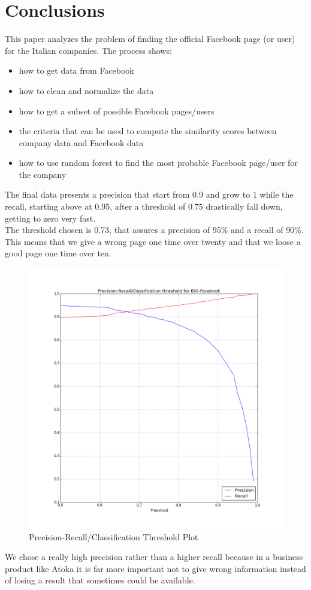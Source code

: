 \chapter{Conclusions} 
This paper analyzes the problem of finding the official Facebook page (or user) for the Italian companies.
The process shows:
\begin{itemize}
\item how to get data from Facebook
\item how to clean and normalize the data
\item how to get a subset of possible Facebook pages/users
\item the criteria that can be used to compute the similarity scores between company data and Facebook data
\item how to use random forest to find the most probable Facebook page/user for the company
\end{itemize}

The final data presents a precision that start from 0.9 and grow to 1 while the recall, starting above at 0.95, after a threshold of 0.75 drastically fall down, getting to zero very fast.\\
The threshold chosen is 0.73, that assures a precision of 95\% and a recall of 90\%. This means that we give a wrong page one time over twenty and that we loose a good page one time over ten.

\begin{figure}
\centering
    \includegraphics[width=0.5\columnwidth]{precision_recall_curve_idg_facebook.png}
    \caption{Precision-Recall/Classification Threshold Plot}
    \label{Fig.5}
\end{figure}

We chose a really high precision rather than a higher recall because in a business product like Atoka it is far more important not to give wrong information instead of losing a result that sometimes could be available.

